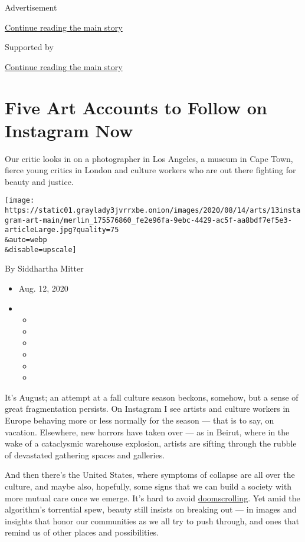 Advertisement

\protect\hyperlink{after-top}{Continue reading the main story}

Supported by

\protect\hyperlink{after-sponsor}{Continue reading the main story}

\hypertarget{five-art-accounts-to-follow-on-instagram-now}{%
\section{Five Art Accounts to Follow on Instagram
Now}\label{five-art-accounts-to-follow-on-instagram-now}}

Our critic looks in on a photographer in Los Angeles, a museum in Cape
Town, fierce young critics in London and culture workers who are out
there fighting for beauty and justice.

\texttt{[image: https://static01.graylady3jvrrxbe.onion/images/2020/08/14/arts/13instagram-art-main/merlin\_175576860\_fe2e96fa-9ebc-4429-ac5f-aa8bdf7ef5e3-articleLarge.jpg?quality=75\\\&auto=webp\\\&disable=upscale]}

By Siddhartha Mitter

\begin{itemize}
\item
  Aug. 12, 2020
\item
  \begin{itemize}
  \item
  \item
  \item
  \item
  \item
  \item
  \end{itemize}
\end{itemize}

It's August; an attempt at a fall culture season beckons, somehow, but a
sense of great fragmentation persists. On Instagram I see artists and
culture workers in Europe behaving more or less normally for the season
--- that is to say, on vacation. Elsewhere, new horrors have taken over
--- as in Beirut, where in the wake of a cataclysmic warehouse
explosion, artists are sifting through the rubble of devastated
gathering spaces and galleries.

And then there's the United States, where symptoms of collapse are all
over the culture, and maybe also, hopefully, some signs that we can
build a society with more mutual care once we emerge. It's hard to avoid
\href{https://www.nytimes3xbfgragh.onion/2020/07/16/technology/coronavirus-doomscrolling.html}{doomscrolling}.
Yet amid the algorithm's torrential spew, beauty still insists on
breaking out --- in images and insights that honor our communities as we
all try to push through, and ones that remind us of other places and
possibilities.

